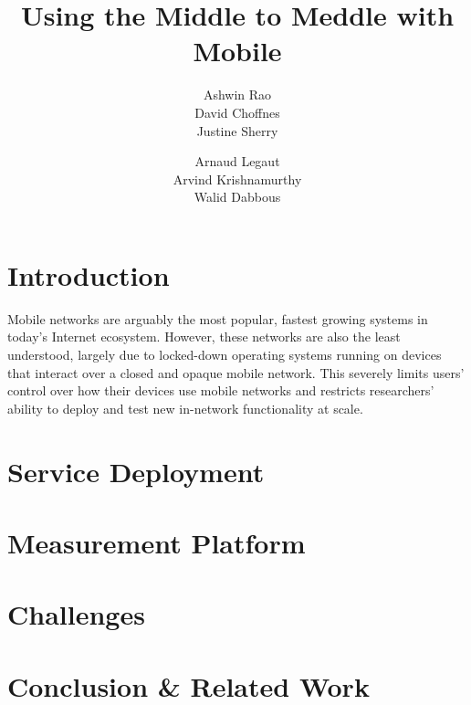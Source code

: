 \documentclass{sig-alternate-10pt}
\title{Using the Middle to Meddle with Mobile\vspace{-25pt}}
\author{
\alignauthor
Ashwin Rao\\
\affaddr{INRIA}
\alignauthor        
David Choffnes\\
\affaddr{University of Washington}
\alignauthor
Justine Sherry\\
\affaddr{UC Berkeley}
\and
\alignauthor
Arnaud Legaut\\
\affaddr{INRIA}
\alignauthor 
Arvind Krishnamurthy\\
\affaddr{University of Washington}
\alignauthor
Walid Dabbous\\
\affaddr{INRIA}
}
\date{}
\newcommand{\eat}[1]{}
\begin{document}
	
    \maketitle
        
    \section{Introduction}
Mobile networks are arguably the most popular, fastest
growing systems in today's Internet ecosystem. 
However, these networks are also the least understood, largely
due to locked-down operating systems running on devices that interact over a closed and opaque mobile network. 
This severely limits users' control over how their
devices use mobile networks and restricts researchers'
ability to deploy and test new in-network functionality
at scale. 
    
    \eat{
    -- services for cell phones
        -- what's diff't about cell phones?
            -- power
                -- prefetching/batching data
                -- offloading processing (virus scanning, comp vision, data analysis)
            -- exfiltration/desire to monitor (even from user)
            -- device limitations (transcoding)
           
        -- what's slightly different but needs tweaked?
            -- IDS -- different attacks/viruses
            -- Proto accel -- some protocols difft?

        -- what's exactly the same
            -- performance
            -- privacy (Do not Track, obfuscation)
            -- Protocol rollout (DNSSEC; SPDY, MPTCP)

    -- users locked out of their own devices
    -- platform for measurement
        }

    \section{Service Deployment}

    \section{Measurement Platform}

    \section{Challenges}

    \section{Conclusion \& Related Work}
   
 
    \scriptsize
    
    
    \normalsize
\end{document}
